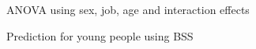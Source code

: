 \documentclass[12pt]{beamer}
\begin{document}
\begin{frame}{\textcolor{bscuro}{ANOVA using sex, job, age and interaction effects}}
	\begin{figure}[!ht] 
		\centering
	\end{figure}
\end{frame}

	
\begin{frame}{\textcolor{bscuro}{Prediction for young people using BSS }}
	\begin{figure}[!ht] 
		\centering
		\qquad
	\end{figure}
\end{frame}
\end{document}
